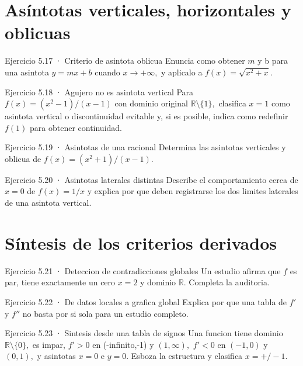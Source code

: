 \documentclass[10pt,a4paper,oneside,openany]{book}
\begin{document}
\section{Asíntotas verticales, horizontales y oblicuas}
\begin{PSevenExerciseFixed}{Ejercicio 5.17 · Criterio de asintota oblicua}
Enuncia como obtener \(m\) y b para una asintota \(y=mx+b\) cuando \(x\to +\infty ,\) y aplicalo a \(f(x)=\sqrt{x^{2}+x}\).
\end{PSevenExerciseFixed}
\begin{PSevenExerciseFixed}{Ejercicio 5.18 · Agujero no es asintota vertical}
Para \(f(x)=(x^{2}-1)/(x-1)\) con dominio original \(\mathbb{R}\setminus \{1\},\) clasifica \(x=1\) como asintota vertical o discontinuidad evitable y, si es posible, indica como redefinir \(f(1)\) para obtener continuidad.
\end{PSevenExerciseFixed}
\begin{PSevenExerciseFixed}{Ejercicio 5.19 · Asintotas de una racional}
Determina las asintotas verticales y oblicua de \(f(x)=(x^{2}+1)/(x-1)\).
\end{PSevenExerciseFixed}
\begin{PSevenExerciseFixed}{Ejercicio 5.20 · Asintotas laterales distintas}
Describe el comportamiento cerca de \(x=0\) de \(f(x)=1/x\) y explica por que deben registrarse los dos limites laterales de una asintota vertical.
\end{PSevenExerciseFixed}
\section{Síntesis de los criterios derivados}
\begin{PSevenExerciseFixed}{Ejercicio 5.21 · Deteccion de contradicciones globales}
Un estudio afirma que \(f\) es par, tiene exactamente un cero \(x=2\) y dominio \(\mathbb{R}\). Completa la auditoria.
\end{PSevenExerciseFixed}
\begin{PSevenExerciseFixed}{Ejercicio 5.22 · De datos locales a grafica global}
Explica por que una tabla de \(f'\) y \(f''\) no basta por si sola para un estudio completo.
\end{PSevenExerciseFixed}
\begin{PSevenExerciseFixed}{Ejercicio 5.23 · Sintesis desde una tabla de signos}
Una funcion tiene dominio \(\mathbb{R}\setminus \{0\},\) es impar, \(f'>0\) en (-infinito,-1) y \((1,\infty ),\) \(f'<0\) en \((-1,0)\) y \((0,1),\) y asintotas \(x=0\) e \(y=0\). Esboza la estructura y clasifica \(x=+/-1\).
\end{PSevenExerciseFixed}
\end{document}
